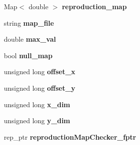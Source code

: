 \begin{DoxyCompactItemize}
\item 
Map$<$ double $>$ {\bfseries reproduction\+\_\+map}\hypertarget{class_reproduction_map_a3681ef51e0b41832c9a1f93b7f7e1137}{}\label{class_reproduction_map_a3681ef51e0b41832c9a1f93b7f7e1137}

\item 
string {\bfseries map\+\_\+file}\hypertarget{class_reproduction_map_a4fdefab63d92f1244422b602ef11b2ee}{}\label{class_reproduction_map_a4fdefab63d92f1244422b602ef11b2ee}

\item 
double {\bfseries max\+\_\+val}\hypertarget{class_reproduction_map_a093ebaad740e4d8b0873bb6e96e5e1c1}{}\label{class_reproduction_map_a093ebaad740e4d8b0873bb6e96e5e1c1}

\item 
bool {\bfseries null\+\_\+map}\hypertarget{class_reproduction_map_a3ae593187d7087cb543f40fe59218257}{}\label{class_reproduction_map_a3ae593187d7087cb543f40fe59218257}

\item 
unsigned long {\bfseries offset\+\_\+x}\hypertarget{class_reproduction_map_acaa2a99d3667440a1e610fd1d0ecda7e}{}\label{class_reproduction_map_acaa2a99d3667440a1e610fd1d0ecda7e}

\item 
unsigned long {\bfseries offset\+\_\+y}\hypertarget{class_reproduction_map_ae70ca7adb1272ed2a15287108526351b}{}\label{class_reproduction_map_ae70ca7adb1272ed2a15287108526351b}

\item 
unsigned long {\bfseries x\+\_\+dim}\hypertarget{class_reproduction_map_aea934c598f314851c50a9d5aa12f8035}{}\label{class_reproduction_map_aea934c598f314851c50a9d5aa12f8035}

\item 
unsigned long {\bfseries y\+\_\+dim}\hypertarget{class_reproduction_map_a48dcb8efff54b3734d2a560f6660dc18}{}\label{class_reproduction_map_a48dcb8efff54b3734d2a560f6660dc18}

\item 
rep\+\_\+ptr {\bfseries reproduction\+Map\+Checker\+\_\+fptr}\hypertarget{class_reproduction_map_a927b35c48a2c3c32a994a95ebfb9aa87}{}\label{class_reproduction_map_a927b35c48a2c3c32a994a95ebfb9aa87}

\end{DoxyCompactItemize}
